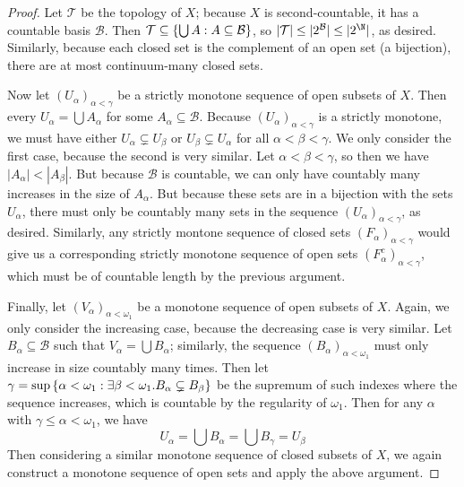 \documentclass[10pt]{article}
\begin{document}
\begin{proof}
    Let $\mathcal{T}$ be the topology of $X$; because $X$ is second-countable, it has a countable basis $\mathcal{B}$.
    Then $\mathcal{T} \subseteq \left\{ {\bigcup A} : {A \subseteq \mathcal{B}} \right\}$, so $|\mathcal{T}| \leq |2^{\mathcal{B}}| \leq |2^{\N}|$, as desired.
    Similarly, because each closed set is the complement of an open set (a bijection), there are at most continuum-many closed sets.

    Now let $(U_{\alpha})_{\alpha < \gamma}$ be a strictly monotone sequence of open subsets of $X$.
    Then every $U_{\alpha} = \bigcup A_{\alpha}$ for some $A_{\alpha} \subseteq \mathcal{B}$.
    Because $(U_{\alpha})_{\alpha < \gamma}$ is a strictly monotone, we must have either $U_{\alpha} \subsetneq U_{\beta}$ or $U_{\beta} \subsetneq U_{\alpha}$ for all $\alpha < \beta < \gamma$.
    We only consider the first case, because the second is very similar.
    Let $\alpha < \beta < \gamma$, so then we have $|A_{\alpha}| < |A_{\beta}|$.
    But because $\mathcal{B}$ is countable, we can only have countably many increases in the size of $A_{\alpha}$.
    But because these sets are in a bijection with the sets $U_{\alpha}$, there must only be countably many sets in the sequence $(U_{\alpha})_{\alpha < \gamma}$, as desired.
    Similarly, any strictly montone sequence of closed sets $(F_{\alpha})_{\alpha < \gamma}$ would give us a corresponding strictly monotone sequence of open sets $(F_{\alpha}^c)_{\alpha < \gamma}$, which must be of countable length by the previous argument.

    Finally, let $(V_{\alpha})_{\alpha < \omega_1}$ be a monotone sequence of open subsets of $X$.
    Again, we only consider the increasing case, because the decreasing case is very similar.
    Let $B_{\alpha} \subseteq \mathcal{B}$ such that $V_{\alpha} = \bigcup B_{\alpha}$; similarly, the sequence $(B_{\alpha})_{\alpha < \omega_1}$ must only increase in size countably many times.
    Then let $\gamma = \sup \left\{ {\alpha < \omega_1} : {\exists \beta < \omega_1. B_{\alpha} \subsetneq B_{\beta}} \right\}$ be the supremum of such indexes where the sequence increases, which is countable by the regularity of $\omega_1$.
    Then for any $\alpha$ with $\gamma \leq \alpha < \omega_1$, we have
    \[
        U_{\alpha} = \bigcup B_{\alpha} = \bigcup B_{\gamma} = U_{\beta}
    \]
    Then considering a similar monotone sequence of closed subsets of $X$, we again construct a monotone sequence of open sets and apply the above argument.
\end{proof}
\end{document}

